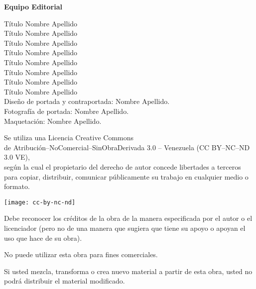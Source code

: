 \begin{footnotesize}
	\textbf{Equipo Editorial}
	
	Título Nombre Apellido\\
	Título Nombre Apellido\\
	Título Nombre Apellido\\
	Título Nombre Apellido\\
	Título Nombre Apellido\\
	Título Nombre Apellido\\
	Título Nombre Apellido\\
	Título Nombre Apellido\\ 

	Diseño de portada y contraportada: Nombre Apellido.\\
	Fotografía de portada: Nombre Apellido.\\
	Maquetación: Nombre Apellido.\\
\end{footnotesize}
	
\begin{scriptsize}
	\begin{center}
	Se utiliza una Licencia Creative Commons \\de Atribución--NoComercial--SinObraDerivada 3.0 -- Venezuela (CC
	BY--NC--ND 3.0 VE), \\según la cual el propietario del derecho de autor concede libertades a terceros para copiar, distribuir, comunicar públicamente su trabajo en cualquier medio o formato.
	\end{center}
	
	\begin{center}
	\texttt{[image: cc-by-nc-nd]}
	\end{center}
	
	\begin{description}[style=multiline,leftmargin=3cm]
	\item[Atribución]Debe reconocer los créditos de la obra de la manera especificada por el autor o el licenciador (pero no de una manera que sugiera que tiene su apoyo o apoyan el uso que hace de su obra).
	\item[No comercial]No puede utilizar esta obra para fines comerciales.
	\item[Sin obra derivada]Si usted mezcla, transforma o crea nuevo material a partir de esta obra, usted no podrá distribuir el material modificado.
	\end{description}
\end{scriptsize}